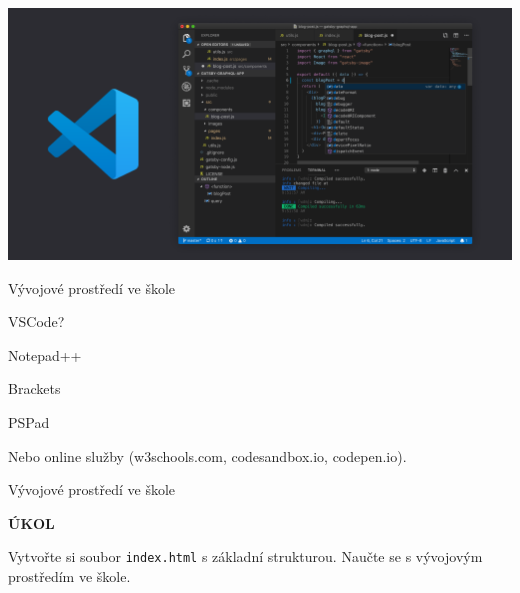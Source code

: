 \documentclass[aspectratio=169]{beamer}
\begin{document}
\begin{frame}
    \begin{center}
        \includegraphics[width=\textwidth]{img/vscode.png}
    \end{center}
\end{frame}


\begin{frame}{Vývojové prostředí ve škole}
    \begin{cardTiny}
        \begin{flushleft}
            VSCode?

            \vspace{3ex}
            Notepad++

            \vspace{3ex}
            Brackets

            \vspace{3ex}
            PSPad

            \vspace{3ex}
            Nebo online služby (w3schools.com, codesandbox.io, codepen.io).
        \end{flushleft}
    \end{cardTiny}
\end{frame}

\begin{frame}{Vývojové prostředí ve škole}
    \begin{cardTiny}
        \begin{center}
            \textbf{ÚKOL}
        \end{center}
        \begin{flushleft}
            Vytvořte si soubor \texttt{index.html} s základní strukturou. Naučte se s vývojovým prostředím ve škole.
        \end{flushleft}
    \end{cardTiny}
\end{frame}
\end{document}
